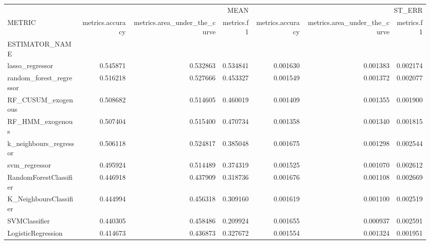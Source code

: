\begin{tabular}{lrrrrrr}
\toprule
 & \multicolumn{3}{r}{MEAN} & \multicolumn{3}{r}{ST_ERR} \\
METRIC & metrics.accuracy & metrics.area_under_the_curve & metrics.f1 & metrics.accuracy & metrics.area_under_the_curve & metrics.f1 \\
ESTIMATOR_NAME &  &  &  &  &  &  \\
\midrule
lasso_regressor & 0.545871 & 0.532863 & 0.534841 & 0.001630 & 0.001383 & 0.002174 \\
random_forest_regressor & 0.516218 & 0.527666 & 0.453327 & 0.001549 & 0.001372 & 0.002077 \\
RF_CUSUM_exogenous & 0.508682 & 0.514605 & 0.460019 & 0.001409 & 0.001355 & 0.001900 \\
RF_HMM_exogenous & 0.507404 & 0.515400 & 0.470734 & 0.001358 & 0.001340 & 0.001815 \\
k_neighbours_regressor & 0.506118 & 0.524817 & 0.385048 & 0.001675 & 0.001298 & 0.002544 \\
svm_regressor & 0.495924 & 0.514489 & 0.374319 & 0.001525 & 0.001070 & 0.002612 \\
RandomForestClassifier & 0.446918 & 0.437909 & 0.318736 & 0.001676 & 0.001108 & 0.002669 \\
K_NeighboursClassifier & 0.444994 & 0.456318 & 0.309160 & 0.001619 & 0.001100 & 0.002519 \\
SVMClassifier & 0.440305 & 0.458486 & 0.209924 & 0.001655 & 0.000937 & 0.002591 \\
LogisticRegression & 0.414673 & 0.436873 & 0.327672 & 0.001554 & 0.001324 & 0.001951 \\
\bottomrule
\end{tabular}
